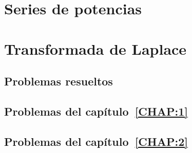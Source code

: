 \documentclass[a4paper, 10pt, openany]{book}
\begin{document}
\chapter{Series de potencias}
\label{CHAP:5}


\chapter{Transformada de Laplace}
\label{CHAP:6}


\begin{appendices}

\chapter{Problemas resueltos}

\section{Problemas del capítulo~\ref{CHAP:1}}


\section{Problemas del capítulo~\ref{CHAP:2}}


\end{appendices}

\backmatter

\listoffigures
{}

\listoftables
{}
\end{document}
